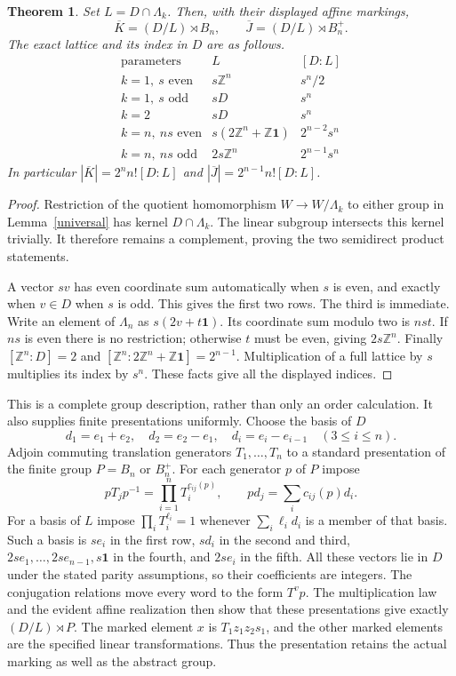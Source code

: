 \documentclass[11pt,a4paper]{article}
\newtheorem{theorem}{Theorem}
\newcommand{\Z}{\mathbb Z}
\newcommand{\one}{\mathbf1}
\begin{document}
\begin{theorem}\label{lattice}
Set $L=D\cap\Lambda_k$. Then, with their displayed affine markings,
\[
 \overline K=(D/L)\rtimes B_n,\qquad
 \overline J=(D/L)\rtimes B_n^+.
\]
The exact lattice and its index in $D$ are as follows.
\[
\begin{array}{c|c|c}
\text{parameters}&L&[D:L]\\\hline
k=1,\ s\text{ even}&s\Z^n&s^n/2\\
k=1,\ s\text{ odd}&sD&s^n\\
k=2&sD&s^n\\
k=n,\ ns\text{ even}&s(2\Z^n+\Z\one)&2^{n-2}s^n\\
k=n,\ ns\text{ odd}&2s\Z^n&2^{n-1}s^n
\end{array}
\]
In particular $|\overline K|=2^nn![D:L]$ and
$|\overline J|=2^{n-1}n![D:L]$.
\end{theorem}
\begin{proof}
Restriction of the quotient homomorphism $W\to W/\Lambda_k$
to either group in Lemma~\ref{universal} has kernel $D\cap\Lambda_k$.
The linear subgroup intersects this kernel trivially. It therefore
remains a complement, proving the two semidirect product statements.

A vector $sv$ has even coordinate sum automatically when $s$ is
even, and exactly when $v\in D$ when $s$ is odd. This gives
the first two rows. The third is immediate. Write an element of
$\Lambda_n$ as $s(2v+t\one)$. Its coordinate sum modulo two is
$nst$. If $ns$ is even there is no restriction; otherwise $t$
must be even, giving $2s\Z^n$.
Finally $[\Z^n:D]=2$ and
$[\Z^n:2\Z^n+\Z\one]=2^{n-1}$.
Multiplication of a full lattice by $s$ multiplies its index by
$s^n$. These facts give all the displayed indices.
\end{proof}

This is a complete group description, rather than only an order
calculation. It also supplies finite presentations uniformly.
Choose the basis of $D$
\[
 d_1=e_1+e_2,\quad d_2=e_2-e_1,\quad
 d_i=e_i-e_{i-1}\quad(3\le i\le n).
\]
Adjoin commuting translation generators $T_1,\ldots,T_n$ to a
standard presentation of the finite group $P=B_n$ or $B_n^+$.
For each generator $p$ of $P$ impose
\[
 pT_jp^{-1}=\prod_{i=1}^nT_i^{c_{ij}(p)},\qquad
 pd_j=\sum_i c_{ij}(p)d_i.
\]
For a basis of $L$ impose $\prod_iT_i^{\ell_i}=1$ whenever
$\sum_i\ell_i d_i$ is a member of that basis. Such a basis is
$se_i$ in the first row, $sd_i$ in the second and third,
$2se_1,\ldots,2se_{n-1},s\one$ in the fourth, and $2se_i$
in the fifth. All these vectors lie in $D$ under the stated
parity assumptions, so their coefficients are integers.
The conjugation relations move every word to the form $T^v p$.
The multiplication law and the evident affine realization then
show that these presentations give exactly $(D/L)\rtimes P$.
The marked element $x$ is $T_1z_1z_2s_1$, and the other marked
elements are the specified linear transformations. Thus the
presentation retains the actual marking as well as the abstract group.
\end{document}
